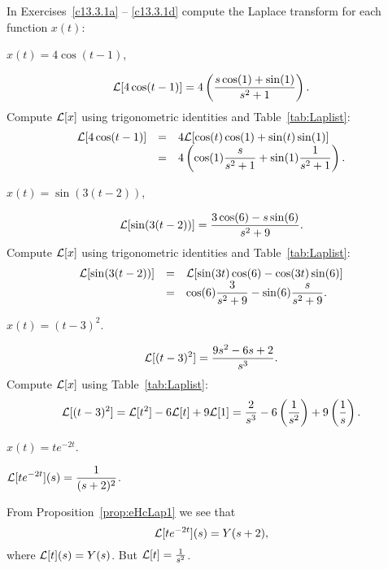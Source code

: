 \documentclass{ximera}
\begin{document}
\noindent In Exercises~\ref{c13.3.1a} -- \ref{c13.3.1d} compute the Laplace 
transform for each function $x(t)$:
\begin{exercise} \label{c13.3.1a}
$x(t) = 4\cos(t-1)$,

\begin{solution}
\ans
\[
{\cal L}[4\cos(t - 1)] =
4\left(\frac{s\cos(1) + \sin(1)}{s^2 + 1}\right).
\]
\soln Compute ${\cal L}[x]$ using trigonometric identities and
Table~\ref{tab:Laplist}:
\[
\begin{array}{rcl}
{\cal L}[4\cos(t - 1)]
& = & 4{\cal L}[\cos(t)\cos(1) + \sin(t)\sin(1)] \\
& = & \displaystyle 4\left(\cos(1)\frac{s}{s^2 + 1} + \sin(1)\frac{1}{s^2 + 1}\right).
\end{array}
\]

\end{solution}
\end{exercise}
\begin{exercise} \label{c13.3.1b}
$x(t) = \sin(3(t-2))$,

\begin{solution}
\ans
\[
{\cal L}[\sin(3(t - 2))] = 
\frac{3\cos(6) - s\sin(6)}{s^2 + 9}.
\]
\soln Compute ${\cal L}[x]$ using trigonometric identities and
Table~\ref{tab:Laplist}:
\[
\begin{array}{rcl}
{\cal L}[\sin(3(t - 2))]
& = & {\cal L}[\sin(3t)\cos(6) - \cos(3t)\sin(6)] \\
& = & \displaystyle \cos(6)\frac{3}{s^2 + 9} - \sin(6)\frac{s}{s^2 + 9}.
\end{array}
\]

\end{solution}
\end{exercise}
\begin{exercise} \label{c13.3.1c}
$x(t) = (t-3)^2$.

\begin{solution}
\ans
\[
{\cal L}[(t - 3)^2] = \frac{9s^2 - 6s + 2}{s^3}.
\]
\soln Compute ${\cal L}[x]$ using Table~\ref{tab:Laplist}:
\[
{\cal L}[(t - 3)^2] = {\cal L}[t^2] - 6{\cal L}[t] + 9{\cal L}[1]
= \frac{2}{s^3} - 6\left(\frac{1}{s^2}\right) + 9\left(\frac{1}{s}
\right).
\]


\end{solution}
\end{exercise}
\begin{exercise} \label{c13.3.1d}
$x(t) = te^{-2t}$.

\begin{solution}
\ans $\displaystyle {\cal L}[te^{-2t}](s)=\frac{1}{(s+2)^2}$.

\soln  From Proposition~\ref{prop:eHcLap1} we see that
\[
{\cal L}[te^{-2t}](s) = Y(s+2),
\]
where ${\cal L}[t](s) = Y(s)$.  But ${\cal L}[t] = \frac{1}{s^2}$.

\end{solution}
\end{exercise}
\end{document}
